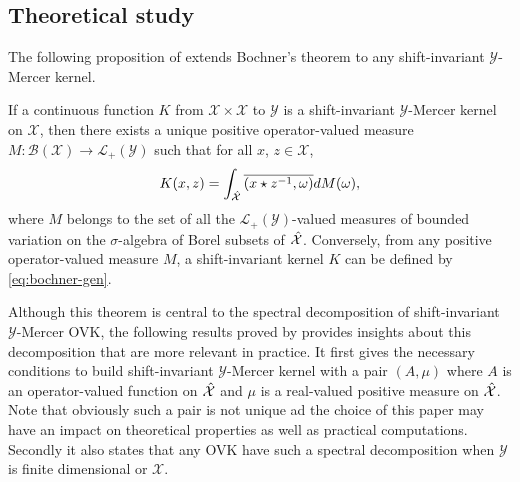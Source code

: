 \subsection{Theoretical study}
The following proposition of \citet{Zhang2012,Carmeli2010} extends Bochner's theorem to any shift-invariant $\mathcal{Y}$-Mercer kernel. 
\begin{proposition}\label{eq:bochner-gen}
If a continuous function $K$ from $\mathcal{X} \times \mathcal{X}$ to $\mathcal{Y}$ is a shift-invariant $\mathcal{Y}$-Mercer kernel on $\mathcal{X}$, then there exists a unique positive operator-valued measure $M: \mathcal{B}(\mathcal{X}) \to \mathcal{L}_+(\mathcal{Y})$ such that for all $x$, $z \in \mathcal{X}$,
\begin{dmath}
K(x, z) = \int_{\dual{\mathcal{X}}} \conj{\pairing{x \groupop \inv{z}, \omega}} dM(\omega),
\end{dmath}
where $M$ belongs to the set of all the $\mathcal{L}_+(\mathcal{Y})$-valued measures of bounded variation on the $\sigma$-algebra of Borel subsets of $\hat{\mathcal{X}}$. Conversely, from any positive operator-valued measure $M$, a shift-invariant kernel $K$ can be defined by \cref{eq:bochner-gen}. 
\end{proposition}
Although this theorem is central to the spectral decomposition of shift-invariant $\mathcal{Y}$-Mercer \acs{OVK}, the following results proved by \citet{Carmeli2010} provides insights about this decomposition that are more relevant in practice. It first gives the necessary conditions to build shift-invariant $\mathcal{Y}$-Mercer kernel with  a pair $(A, \mu)$ where $A$ is an operator-valued function on $\hat{\mathcal{X}}$ and $\mu$ is a real-valued positive measure on $\hat{\mathcal{X}}$. Note that obviously such a pair is not unique ad the choice of this paper may have an impact on theoretical properties as well as practical computations.
Secondly it also states that any \acs{OVK} have such a spectral decomposition when $\mathcal{Y}$ is finite dimensional or $\mathcal{X}$.

